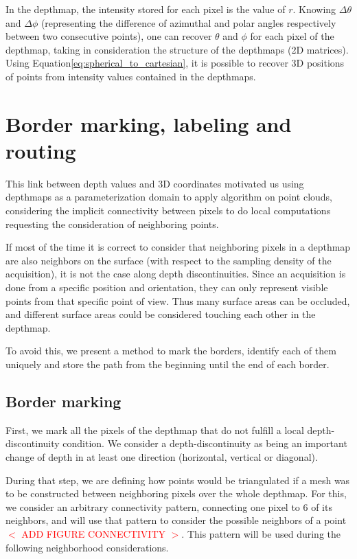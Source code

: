\documentclass[11pt,fleqn]{book} %
\newcommand{\arnaud}[1]{\textcolor{red}{$<$ #1 $>$}}
\begin{document}
In the depthmap, the intensity stored for each pixel is the value of $r$. Knowing $\Delta\theta$ and $\Delta\phi$ (representing the difference of azimuthal and polar angles respectively between two consecutive points), one can recover $\theta$ and $\phi$ for each pixel of the depthmap, taking in consideration the structure of the depthmaps (2D matrices). 
Using Equation\eqref{eq:spherical_to_cartesian}, it is possible to recover 3D positions of points from intensity values contained in the depthmaps.

\section{Border marking, labeling and routing}
\label{sec:border_marking}

This link between depth values and 3D coordinates motivated us using depthmaps as a parameterization domain to apply algorithm on point clouds, considering the implicit connectivity between pixels to do local computations requesting the consideration of neighboring points.

If most of the time it is correct to consider that neighboring pixels in a depthmap are also neighbors on the surface (with respect to the sampling density of the acquisition), it is not the case along depth discontinuities.
Since an acquisition is done from a specific position and orientation, they can only represent visible points from that specific point of view. Thus many surface areas can be occluded, and different surface areas could be considered touching each other in the depthmap.

To avoid this, we present a method to mark the borders, identify each of them uniquely and store the path from the beginning until the end of each border.

\subsection{Border marking}
First, we mark all the pixels of the depthmap that do not fulfill a local depth-discontinuity condition. We consider a depth-discontinuity as being an important change of depth in at least one direction (horizontal, vertical or diagonal).

During that step, we are defining how points would be triangulated if a mesh was to be constructed between neighboring pixels over the whole depthmap. For this, we consider an arbitrary connectivity pattern, connecting one pixel to 6 of its neighbors, and will use that pattern to consider the possible neighbors of a point \arnaud{ADD FIGURE CONNECTIVITY}. This pattern will be used during the following neighborhood considerations.
\end{document}
